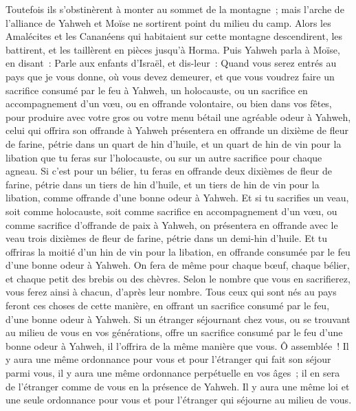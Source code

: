 \begin{multicols}{2}
Toutefois ils s'obstinèrent à monter au sommet de la montagne~; mais l'arche de l'alliance de Yahweh et Moïse ne sortirent point du milieu du camp.
Alors les Amalécites et les Cananéens qui habitaient sur cette montagne descendirent, les battirent, et les taillèrent en pièces jusqu'à Horma.
\VerseOne{}Puis Yahweh parla à Moïse, en disant~:
Parle aux enfants d'Israël, et dis-leur~: Quand vous serez entrés au pays que je vous donne, où vous devez demeurer,
et que vous voudrez faire un sacrifice consumé par le feu à Yahweh, un holocauste, ou un sacrifice en accompagnement d'un vœu, ou en offrande volontaire, ou bien dans vos fêtes, pour produire avec votre gros ou votre menu bétail une agréable odeur à Yahweh,
celui qui offrira son offrande à Yahweh présentera en offrande un dixième de fleur de farine, pétrie dans un quart de hin d'huile,
et un quart de hin de vin pour la libation que tu feras sur l'holocauste, ou sur un autre sacrifice pour chaque agneau.
Si c'est pour un bélier, tu feras en offrande deux dixièmes de fleur de farine, pétrie dans un tiers de hin d'huile,
et un tiers de hin de vin pour la libation, comme offrande d'une bonne odeur à Yahweh.
Et si tu sacrifies un veau, soit comme holocauste, soit comme sacrifice en accompagnement d'un vœu, ou comme sacrifice d'offrande de paix à Yahweh,
on présentera en offrande avec le veau trois dixièmes de fleur de farine, pétrie dans un demi-hin d'huile.
Et tu offriras la moitié d'un hin de vin pour la libation, en offrande consumée par le feu d'une bonne odeur à Yahweh.
On fera de même pour chaque bœuf, chaque bélier, et chaque petit des brebis ou des chèvres.
Selon le nombre que vous en sacrifierez, vous ferez ainsi à chacun, d'après leur nombre.
Tous ceux qui sont nés au pays feront ces choses de cette manière, en offrant un sacrifice consumé par le feu, d'une bonne odeur à Yahweh.
Si un étranger séjournant chez vous, ou se trouvant au milieu de vous en vos générations, offre un sacrifice consumé par le feu d'une bonne odeur à Yahweh, il l'offrira de la même manière que vous.
Ô assemblée~! Il y aura une même ordonnance pour vous et pour l'étranger qui fait son séjour parmi vous, il y aura une même ordonnance perpétuelle en vos âges~; il en sera de l'étranger comme de vous en la présence de Yahweh.
Il y aura une même loi et une seule ordonnance pour vous et pour l'étranger qui séjourne au milieu de vous.

\end{multicols}
